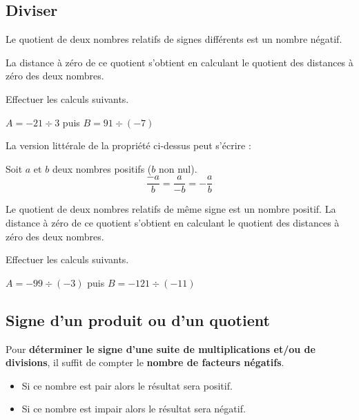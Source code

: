 \documentclass[a4paper]{book}
\begin{document}
\subsection{Diviser}
    
    \begin{propriete} 
        Le quotient de deux nombres relatifs de signes différents est un nombre négatif. 
        
        La distance à zéro de ce quotient s'obtient en calculant le quotient des distances à zéro des deux nombres.
    \end{propriete}
    
    \begin{exemple}
        Effectuer les calculs suivants.
        
        $A = -21 \div 3 $ puis $B=91\div(-7)$
    \end{exemple}
    
    \begin{remarque} 
        La version littérale de la propriété ci-dessus peut s'écrire :
        
        Soit \( a \) et \( b \) deux nombres positifs (\( b \) non nul).
        \[
        \frac{-a}{b} = \frac{a}{-b} = -\frac{a}{b}
        \]
    \end{remarque}
    
    \begin{propriete} 
        Le quotient de deux nombres relatifs de même signe est un nombre positif. La distance à zéro de ce quotient s'obtient en calculant le quotient des distances à zéro des deux nombres.
    \end{propriete}
    
    \begin{exemple}
        Effectuer les calculs suivants.
        
        $A = -99 \div (-3) $ puis $B=-121\div(-11)$
    \end{exemple}
    
\subsection{Signe d'un produit ou d'un quotient}
    
    \begin{propriete}
        Pour \textbf{déterminer le signe d'une suite de multiplications et/ou de divisions}, il suffit de compter le \textbf{nombre de facteurs négatifs}.
        \begin{itemize}
            \item Si ce nombre est pair alors le résultat sera positif.
            \item Si ce nombre est impair alors le résultat sera négatif.
        \end{itemize}
    \end{propriete}
    
\end{document}
